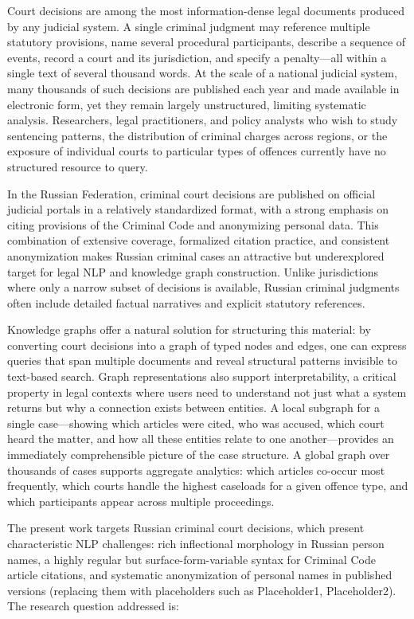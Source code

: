\documentclass[11pt]{article}
\begin{document}
Court decisions are among the most information-dense legal documents produced by any judicial system. A single criminal judgment may reference multiple statutory provisions, name several procedural participants, describe a sequence of events, record a court and its jurisdiction, and specify a penalty---all within a single text of several thousand words. At the scale of a national judicial system, many thousands of such decisions are published each year and made available in electronic form, yet they remain largely unstructured, limiting systematic analysis. Researchers, legal practitioners, and policy analysts who wish to study sentencing patterns, the distribution of criminal charges across regions, or the exposure of individual courts to particular types of offences currently have no structured resource to query.

In the Russian Federation, criminal court decisions are published on official judicial portals in a relatively standardized format, with a strong emphasis on citing provisions of the Criminal Code and anonymizing personal data. This combination of extensive coverage, formalized citation practice, and consistent anonymization makes Russian criminal cases an attractive but underexplored target for legal NLP and knowledge graph construction. Unlike jurisdictions where only a narrow subset of decisions is available, Russian criminal judgments often include detailed factual narratives and explicit statutory references.

Knowledge graphs offer a natural solution for structuring this material: by converting court decisions into a graph of typed nodes and edges, one can express queries that span multiple documents and reveal structural patterns invisible to text-based search. Graph representations also support interpretability, a critical property in legal contexts where users need to understand not just what a system returns but why a connection exists between entities. A local subgraph for a single case---showing which articles were cited, who was accused, which court heard the matter, and how all these entities relate to one another---provides an immediately comprehensible picture of the case structure. A global graph over thousands of cases supports aggregate analytics: which articles co-occur most frequently, which courts handle the highest caseloads for a given offence type, and which participants appear across multiple proceedings.

The present work targets Russian criminal court decisions, which present characteristic NLP challenges: rich inflectional morphology in Russian person names, a highly regular but surface-form-variable syntax for Criminal Code article citations, and systematic anonymization of personal names in published versions (replacing them with placeholders such as Placeholder1, Placeholder2). The research question addressed is:
\end{document}
